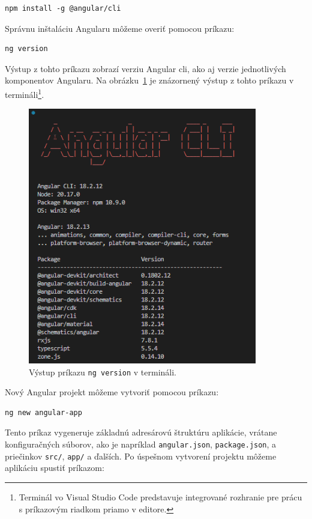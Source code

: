 \begin{verbatim}
npm install -g @angular/cli
\end{verbatim}

Správnu inštaláciu Angularu môžeme overiť pomocou príkazu:

\begin{verbatim}
ng version
\end{verbatim}

Výstup z tohto príkazu zobrazí verziu Angular \acrshort{cli}, ako aj verzie jednotlivých komponentov Angularu. Na obrázku~\ref{fig:ng-version} je znázornený výstup z tohto príkazu v termináli\footnote{Terminál vo Visual Studio Code predstavuje integrované rozhranie pre prácu s príkazovým riadkom priamo v editore.}.

\begin{figure}[H]
  \centering
  \includegraphics[width=10cm]{img/ng-version.png}
  \caption{Výstup príkazu \texttt{ng version} v termináli.}
  \label{fig:ng-version}
\end{figure}

\bigskip
Nový Angular projekt môžeme vytvoriť pomocou príkazu:

\begin{verbatim}
ng new angular-app
\end{verbatim}

Tento príkaz vygeneruje základnú adresárovú štruktúru aplikácie, vrátane konfiguračných súborov, ako je napríklad \texttt{angular.json}, \texttt{package.json}, a priečinkov \texttt{src/}, \texttt{app/} a ďalších. Po úspešnom vytvorení projektu môžeme aplikáciu spustiť príkazom:

